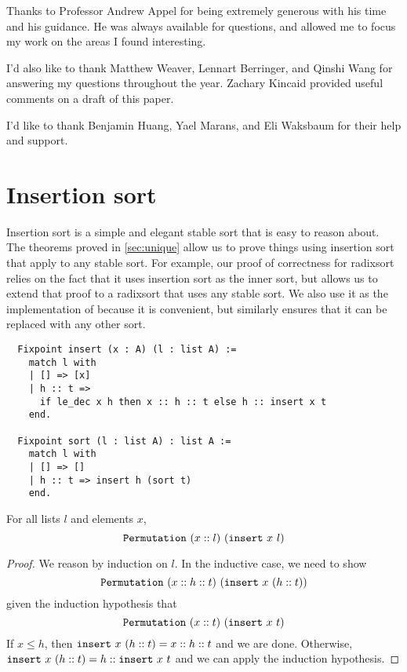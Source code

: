 \documentclass[sigplan,10pt,anonymous,review]{thesis}
\begin{document}
\begin{acks}
Thanks to Professor Andrew Appel for being extremely generous with his
time and his guidance. He was always available for questions, and
allowed me to focus my work on the areas I found interesting.

I'd also like to thank Matthew Weaver, Lennart Berringer, and Qinshi
Wang for answering my questions throughout the year. Zachary Kincaid
provided useful comments on a draft of this paper.

I'd like to thank Benjamin Huang, Yael Marans, and Eli Waksbaum for
their help and support.
\end{acks}



\appendix

\section{Insertion sort}
\label{appendix:insertion_sort}

Insertion sort is a simple and elegant stable sort that is easy to
reason about. The theorems proved in \cref{sec:unique} allow us to
prove things using insertion sort that apply to any stable sort. For
example, our proof of correctness for radixsort relies on the fact
that it uses insertion sort as the inner sort, but
 allows us to extend that proof to a
radixsort that uses any stable sort. We also use it as the
implementation of  because it is convenient, but
similarly  ensures that it can be replaced with
any other sort.

\begin{lstlisting}
  Fixpoint insert (x : A) (l : list A) :=
    match l with
    | [] => [x]
    | h :: t =>
      if le_dec x h then x :: h :: t else h :: insert x t
    end.

  Fixpoint sort (l : list A) : list A :=
    match l with
    | [] => []
    | h :: t => insert h (sort t)
    end.
\end{lstlisting}

\begin{lemma}
  For all lists $l$ and elements $x$,
  \begin{equation*}
    \texttt{\textup{Permutation}}~(x::l)~(\texttt{\textup{insert}}~x~l)
  \end{equation*}
\end{lemma}
\begin{proof}
  We reason by induction on $l$. In the inductive case, we need to show
  \begin{equation*}
    \texttt{\textup{Permutation}}~(x::h::t)~(\texttt{\textup{insert}}~x~(h::t))
  \end{equation*}
  given the induction hypothesis that
  \begin{equation*}
    \texttt{\textup{Permutation}}~(x::t)~(\texttt{\textup{insert}}~x~t)
  \end{equation*}
  If $x \le h$, then $\texttt{\textup{insert}}~x~(h::t) = x :: h :: t$ and we are
  done. Otherwise, $\texttt{\textup{insert}}~x~(h::t) = h :: \texttt{\textup{insert}}~x~t$ and
  we can apply the induction hypothesis.
\end{proof}
\end{document}
